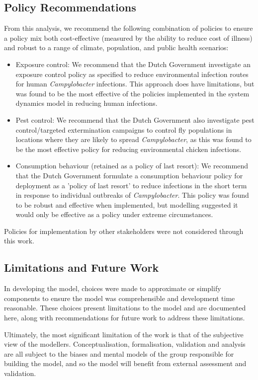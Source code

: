 \subsection{Policy Recommendations}
From this analysis, we recommend the following combination of policies to ensure a policy mix both cost-effective (measured by the ability to reduce cost of illness) and robust to a range of climate, population, and public health scenarios:
\begin{itemize}
    \item Exposure control: We recommend that the Dutch Government investigate an exposure control policy as specified to reduce environmental infection routes for human \textit{Campylobacter} infections. This approach does have limitations, but was found to be the most effective of the policies implemented in the system dynamics model in reducing human infections.
    \item Pest control: We recommend that the Dutch Government also investigate pest control/targeted extermination campaigns to control fly populations in locations where they are likely to spread \textit{Campylobacter}, as this was found to be the most effective policy for reducing environmental chicken infections.
    \item Consumption behaviour (retained as a policy of last resort): We recommend that the Dutch Government formulate a consumption behaviour policy for deployment as a 'policy of last resort' to reduce infections in the short term in response to individual outbreaks of \textit{Campylobacter}. This policy was found to be robust and effective when implemented, but modelling suggested it would only be effective as a policy under extreme circumstances.
\end{itemize}

Policies for implementation by other stakeholders were not considered through this work.
\subsection{Limitations and Future Work}

In developing the model, choices were made to approximate or simplify components to ensure the model was comprehensible and development time reasonable. These choices present limitations to the model and are documented here, along with recommendations for future work to address these limitations.

Ultimately, the most significant limitation of the work is that of the subjective view of the modellers. Conceptualisation, formalisation, validation and analysis are all subject to the biases and mental models of the group responsible for building the model, and so the model will benefit from external assessment and validation.

